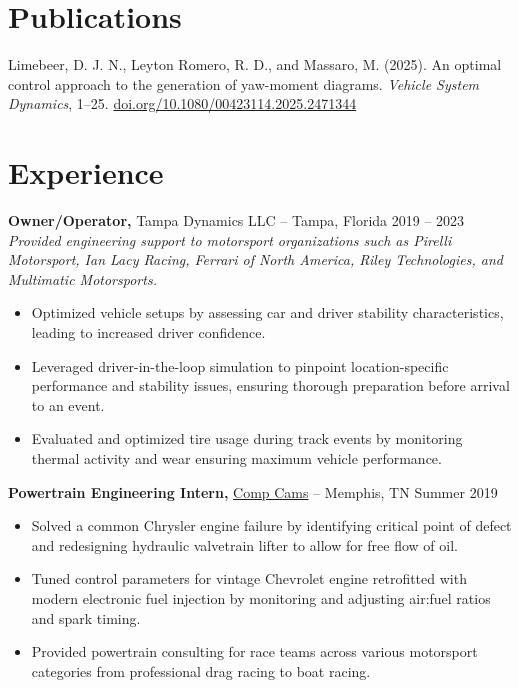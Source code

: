 \documentclass[12pt,letterpaper]{article} %
\begin{document}
\vspace{-18.5pt} %


\section*{Publications}

Limebeer, D. J. N., Leyton Romero, R. D., and Massaro, M. (2025). An optimal control approach to the generation of yaw-moment diagrams. \textit{Vehicle System Dynamics}, 1–25. \href{https://doi.org/10.1080/00423114.2025.2471344}{doi.org/10.1080/00423114.2025.2471344}


\vspace{-10.5pt} %


\section*{Experience}
\textbf{Owner/Operator,} Tampa Dynamics LLC -- Tampa, Florida \hfill 2019 -- 2023 \\
\vspace{3pt}
\textit{Provided engineering support to motorsport organizations such as Pirelli Motorsport, Ian Lacy Racing, Ferrari of North America, Riley Technologies, and Multimatic Motorsports.}
\vspace{-5pt}
\begin{itemize}
  \item Optimized vehicle setups by assessing car and driver stability characteristics, leading to increased driver confidence.
  \item Leveraged driver-in-the-loop simulation to pinpoint location-specific performance and stability issues, ensuring thorough preparation before arrival to an event.
  \item Evaluated and optimized tire usage during track events by monitoring thermal activity and wear ensuring maximum vehicle performance.
\end{itemize}

\textbf{Powertrain Engineering Intern,} \href{https://www.compcams.com/}{Comp Cams} -- Memphis, TN \hfill Summer 2019 \\
\vspace{-9pt}
\begin{itemize}
  \item Solved a common Chrysler engine failure by identifying critical point of defect and redesigning hydraulic valvetrain lifter to allow for free flow of oil.
  \item Tuned control parameters for vintage Chevrolet engine retrofitted with modern electronic fuel injection by monitoring and adjusting air:fuel ratios and spark timing.
  \item Provided powertrain consulting for race teams across various motorsport categories from professional drag racing to boat racing.
\end{itemize}
\end{document}
